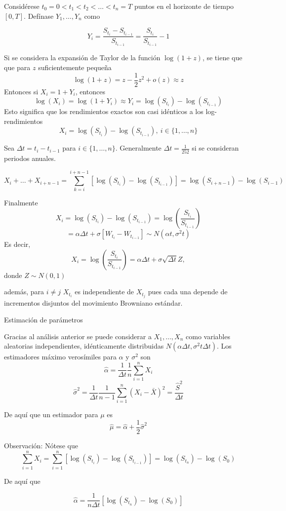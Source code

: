 \documentclass[12pt,reqno,letter]{article}
\begin{document}
	Considérese $t_0=0 < t_1 < t_2 <\ldots<t_n=T$ puntos en el horizonte de tiempo $[0,T]$. Defínase $Y_1,\ldots,Y_n$ como
	
	$$Y_i = \frac{S_{t_i}-S_{t_{i-1}}}{S_{t_{i-1}}}=\frac{S_{t_i}}{S_{t_{i-1}}}-1$$
	
	Si se considera la expansión de Taylor de la función $\log(1+z)$, se tiene que que para $z$ suficientemente pequeña
	$$\log(1+z) = z-\frac{1}{2}z^2 + o(z) \approx z$$
	Entonces si $X_i = 1+ Y_i$, entonces
	$$\log(X_i) = \log(1+Y_i) \approx Y_i = \log(S_{t_i})-\log(S_{t_{i-1}})$$
	Esto significa que los rendimientos exactos son casi idénticos a los log-rendimientos
	$$X_i = \log(S_{t_i})-\log(S_{t_{i-1}}),\ i\in\{1,\ldots,n\}$$
	
	Sea $\Delta t = t_i - t_{i-1}$ para $i\in\{1,\ldots,n\}$. Generalmente $\Delta t = \frac{1}{252}$ si se consideran periodos anuales.
	
	$$X_i + \ldots + X_{i+n-1}=\sum_{k=i}^{i+n-1}[\log(S_{t_i})-\log(S_{t_{i-1}})]=\log(S_{i+n-1})-\log(S_{i-1})$$
	
	Finalmente
	$$X_i = \log(S_{t_i})-\log(S_{t_{i-1}}) = \log\left(\frac{S_{t_i}}{S_{t_{i-1}}}\right)$$
	$$=\alpha \Delta t + \sigma[W_{t_i}-W_{t_{i-1}}]\sim N(\alpha t , \sigma^2 t)$$
	Es decir,
	$$X_i = \log\left(\frac{S_{t_i}}{S_{t_{i-1}}}\right) = \alpha \Delta t + \sigma\sqrt{\Delta t}Z,$$
	donde $Z\sim N(0,1)$
	
	además, para $i\neq j$ $X_{t_i}$ es independiente de $X_{t_j}$ pues cada una depende de incrementos disjuntos del movimiento Browniano estándar.
	
	Estimación de parámetros
	
	Gracias al análisis anterior se puede considerar a $X_1,\ldots,X_n$ como variables aleatorias independientes, idénticamente distribuidas $N(\alpha\Delta t,\sigma^2t \Delta t)$. Los estimadores máximo verosímiles para $\alpha$ y $\sigma^2$ son
	$$\widehat{\alpha}=\frac{1}{\Delta t}\frac{1}{n}\sum_{i=1}^n X_i$$
	$$\widehat{\sigma}^2 = \frac{1}{\Delta t}\frac{1}{n-1}\sum_{i=1}^n(X_i-\bar{X})^2=\frac{\widehat{S}^2}{\Delta t}$$
	
	De aquí que un estimador para $\mu$ es
	$$\widehat{\mu} = \widehat{\alpha} + \frac{1}{2}\widehat{\sigma}^2$$
	
	Observación:
	Nótese que 
	$$\sum_{i=1}^n X_i = \sum_{i=1}^n [\log(S_{t_i})-\log(S_{t_{i-1}})]=\log(S_{t_n})-\log(S_0)$$
	
	De aquí que
	
	$$\widehat{\alpha}=\frac{1}{n\Delta t}[\log(S_{t_n})-\log(S_0)]$$
	
\end{document}
